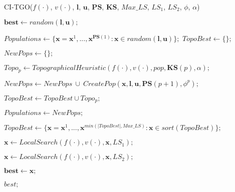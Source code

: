 \begin{breakablealgorithm}
\caption{CI-TGO($f(\cdot)$, $v(\cdot)$, $\bm{l}$, $\bm{u}$, $\bm{PS}$, $\bm{KS}$, $Max\_LS$, $LS_1$, $LS_2$, $\phi$, $\alpha$)}
\label{alg:ITGO}
\begin{spacing}{1.5}
\begin{algorithmic}[1]

\Statex
\State $\bm{best} \gets random(\bm{l}, \bm{u});$



\State $Populations \gets \{\bm{x} = \bm{x}^1, ..., \bm{x}^{\bm{PS}(1)} : \bm{x} \in random(\bm{l}, \bm{u}) \};$
\State $TopoBest \gets \{\};$


\State $NewPops \gets \{\};$


\State $Topo_p \gets TopographicalHeuristic(f(\cdot), v(\cdot), pop, \bm{KS}(p), \alpha);$



\State $NewPops \gets NewPops \ \cup \ CreatePop(\bm{x}, \bm{l}, \bm{u},\bm{PS}(p+1), \phi^p);$
\EndFor

\Else
\State $TopoBest \gets TopoBest \cup Topo_p;$
\EndIf
\EndFor

\State $Populations \gets NewPops;$
\EndIf
\EndFor

\State $TopoBest \gets \{\bm{x} = \bm{x}^1, ..., \bm{x}^{min(|TopoBest|, Max\_LS)} : \bm{x} \in sort(TopoBest)\};$


\State $\bm{x} \gets LocalSearch(f(\cdot), v(\cdot), \bm{x}, LS_1);$



\State $\bm{x} \gets LocalSearch(f(\cdot), v(\cdot), \bm{x}, LS_2);$


\State $\bm{best} \gets \bm{x};$
\EndIf
\EndIf

\EndFor

\EndWhile

\State \Return $best;$


\end{algorithmic}
\end{spacing}
\end{breakablealgorithm}